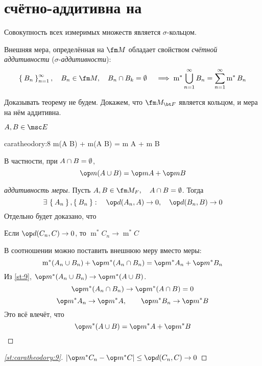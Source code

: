 \section{ счётно-аддитивна на }

\begin{theorem}
	Совокупность всех измеримых множеств является $ \sigma $-кольцом.

	Внешняя мера, определённая на $ \fm M $ обладает свойством \emph{счётной аддитивности} ($ \sigma $-\emph{аддитивности}):
	$$ \set{B_n}_{n = 1}^\infty, \quad B_n \in \fm M, \quad B_n \cap B_k = \O \quad \implies \operatorname m^* \bigcup_{n = 1}^\infty B_n = \sum_{n = 1}^\infty \operatorname m^* B_n $$
\end{theorem}

Доказывать теорему не будем. Докажем, что $ \fm M_{\bt F} $ является кольцом, и мера на нём аддитивна.

\begin{statement}
	$ A, B \in \msc E $
	\begin{equ}{caratheodory:8}
		\implies \op m(A \cup B) + \op m(A \cap B) = \op m A + \op m B
	\end{equ}
\end{statement}

В частности, при $ A \cap B = \emptyset $,
$$ \op m(A \cup B) = \op m A + \op m B $$

\begin{proof}[аддитивность меры]
	Пусть $ A, B \in \fm M_F, \quad A \cap B = \O $. Тогда
	$$ \exist \set{A_n}, \set{B_n} : \quad \op d(A_n, A) \to 0, \quad \op d(B_n, B) \to 0 $$
	Отдельно будет доказано, что
	\begin{statement}\label{st:caratheodory:9}
		Если $ \op d(C_n, C) \to 0 $, то $ \operatorname m^* C_n \to \operatorname m^* C $
	\end{statement}
	В соотношении  можно поставить внешнюю меру вместо меры:
	$$ \operatorname m^*(A_n \cup B_n) + \op m^*(A_n \cap B_n) = \op m^* A_n + \op m^* B_n $$
	Из \autoref{st:9}, $ \op m^*(A_n \cup B_n) \to \op m^*(A \cup B) $.
	$$ \op m^*(A_n \cap B_n) \to \op m^*(A \cap B) = 0 $$
	$$ \op m^* A_n \to \op m^* A, \qquad \op m^* B_n \to \op m^* B $$
	Это всё влечёт, что
	$$ \op m^*(A \cup B) = \op m^* A + \op m^* B $$
\end{proof}

\vspace{0.5em}

\begin{proof}[\autoref{st:caratheodory:9}]
	$ |\op m^* C_n - \op m^* C| \le \op d(C_n, C) \to 0 $
\end{proof}

